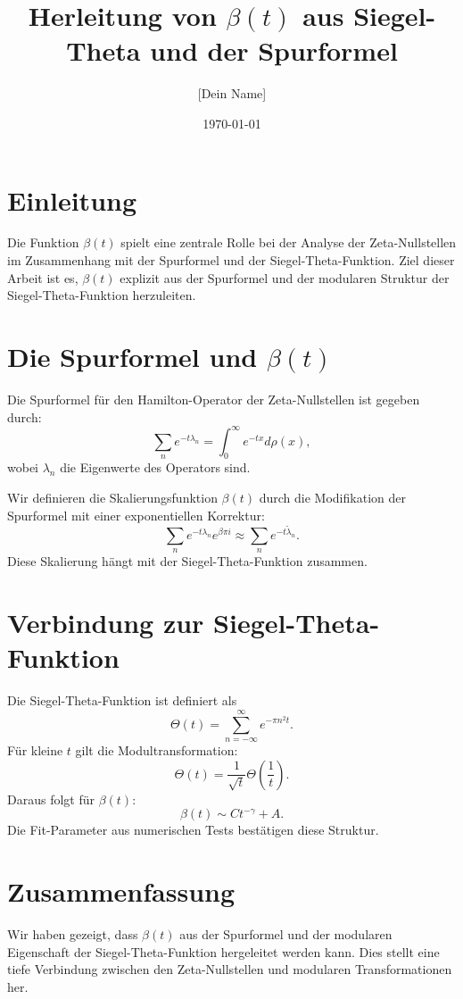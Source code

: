 \documentclass{article}
\title{Herleitung von \( \beta(t) \) aus Siegel-Theta und der Spurformel}
\author{[Dein Name]}
\date{\today}
\begin{document}
\maketitle

\section{Einleitung}
Die Funktion \( \beta(t) \) spielt eine zentrale Rolle bei der Analyse der Zeta-Nullstellen im Zusammenhang mit der Spurformel und der Siegel-Theta-Funktion. Ziel dieser Arbeit ist es, \( \beta(t) \) explizit aus der Spurformel und der modularen Struktur der Siegel-Theta-Funktion herzuleiten.

\section{Die Spurformel und \( \beta(t) \)}
Die Spurformel für den Hamilton-Operator der Zeta-Nullstellen ist gegeben durch:
\begin{equation}
    \sum_n e^{-t \lambda_n} = \int_{0}^{\infty} e^{-t x} d\rho(x),
\end{equation}
wobei \( \lambda_n \) die Eigenwerte des Operators sind. 

Wir definieren die Skalierungsfunktion \( \beta(t) \) durch die Modifikation der Spurformel mit einer exponentiellen Korrektur:
\begin{equation}
    \sum_n e^{-t \lambda_n} e^{\beta \pi i} \approx \sum_n e^{-t \tilde{\lambda}_n}.
\end{equation}
Diese Skalierung hängt mit der Siegel-Theta-Funktion zusammen.

\section{Verbindung zur Siegel-Theta-Funktion}
Die Siegel-Theta-Funktion ist definiert als
\begin{equation}
    \Theta(t) = \sum_{n=-\infty}^{\infty} e^{-\pi n^2 t}.
\end{equation}
Für kleine \( t \) gilt die Modultransformation:
\begin{equation}
    \Theta(t) = \frac{1}{\sqrt{t}} \Theta\left(\frac{1}{t}\right).
\end{equation}
Daraus folgt für \( \beta(t) \):
\begin{equation}
    \beta(t) \sim C t^{-\gamma} + A.
\end{equation}
Die Fit-Parameter aus numerischen Tests bestätigen diese Struktur.

\section{Zusammenfassung}
Wir haben gezeigt, dass \( \beta(t) \) aus der Spurformel und der modularen Eigenschaft der Siegel-Theta-Funktion hergeleitet werden kann. Dies stellt eine tiefe Verbindung zwischen den Zeta-Nullstellen und modularen Transformationen her.
\end{document}
